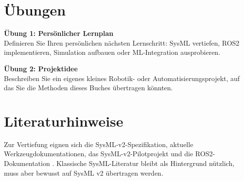 \section{Übungen}
\begin{uebungbox}
\textbf{Übung 1: Persönlicher Lernplan}\\
Definieren Sie Ihren persönlichen nächsten Lernschritt: SysML vertiefen, ROS2 implementieren, Simulation aufbauen oder ML-Integration ausprobieren.
\end{uebungbox}

\begin{uebungbox}
\textbf{Übung 2: Projektidee}\\
Beschreiben Sie ein eigenes kleines Robotik- oder Automatisierungsprojekt, auf das Sie die Methoden dieses Buches übertragen könnten.
\end{uebungbox}

\section{Literaturhinweise}
Zur Vertiefung eignen sich die SysML-v2-Spezifikation, aktuelle Werkzeugdokumentationen, das SysML-v2-Pilotprojekt und die ROS2-Dokumentation \cite{sysmlv2spec,sysmlv2pilot,ros2docs}. Klassische SysML-Literatur \cite{delligatti2014,friedenthal2014} bleibt als Hintergrund nützlich, muss aber bewusst auf SysML v2 übertragen werden.
